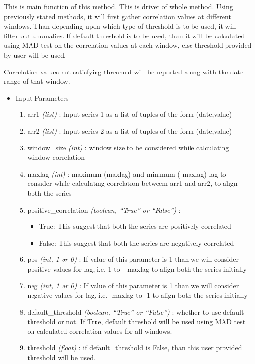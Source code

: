 This is main function of this method. This is driver of whole method. Using 
previously stated methods, it will first gather correlation values at different 
windows. Than depending upon which type of threshold is to be used, it will 
filter out anomalies. If default threshold is to be used, than it will be 
calculated using MAD test on the correlation values at each window, else 
threshold provided by user will be used. 

Correlation values not satisfying threshold will be reported along with the date 
range of that window.


\begin{itemize}
 \item Input Parameters
 
 \begin{enumerate}
  \item arr1 \textit{(list)} : Input series 1 as a list of tuples of the form 
(date,value)
  \item arr2 \textit{(list)} : Input series 2 as a list of tuples of the form 
(date,value)
  \item window\_size \textit{(int)} : window size to be considered while 
calculating window correlation
  \item maxlag \textit{(int)} : maximum (maxlag) and minimum (-maxlag) lag to 
consider while calculating correlation betweem arr1 and arr2, to align both the 
series
  \item positive\_correlation \textit{(boolean, ``True'' or ``False'')} : 
      \begin{itemize}
       \item True: This suggest that both the series are positively correlated
       \item False: This suggest that both the series are negatively correlated
      \end{itemize}
      
  \item pos \textit{(int, 1 or 0)} : If value of this parameter is 1 than we 
will consider positive values for lag, i.e. 1 to +maxlag to align both the 
series initially
  \item neg \textit{(int, 1 or 0)} : If value of this parameter is 1 than we 
will consider negative values for lag, i.e. -maxlag to -1 to align both the 
series initially
  \item default\_threshold \textit{(boolean, ``True'' or ``False'')} : whether 
to use default threshold or not. If True, default threshold will be used using 
MAD test on calculated correlation values for all windows.
  \item threshold \textit{(float)} : if default\_threshold is False, than this 
user provided threshold will be used.
 \end{enumerate}


\end{itemize}
